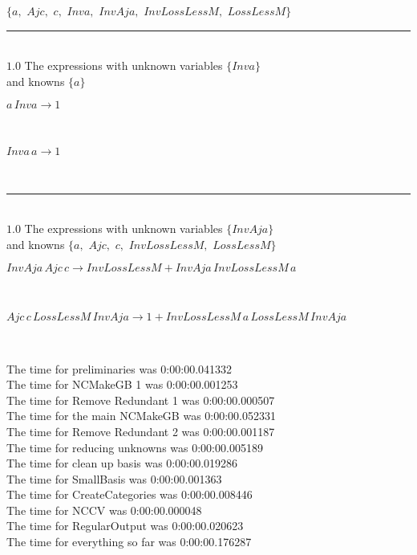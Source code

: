 \documentclass[rep10,leqno]{report}
\begin{document}
$\{a,
$ $
Ajc,
$ $
c,
$ $
Inva,
$ $
InvAja,
$ $
InvLossLessM,
$ $
LossLessM\}$
\smallskip\\
\rule[3pt]{6in}{.7pt}\\
$1.0$  The expressions with unknown variables $\{Inva\}$\\
and knowns $\{a\}$\smallskip\\
\begin{minipage}{6in}
$
a\,
 Inva\rightarrow 1
$
\end{minipage}\medskip \\
\begin{minipage}{6in}
$
Inva\,
 a\rightarrow 1
$
\end{minipage}\\
\rule[3pt]{6in}{.7pt}\\
$1.0$  The expressions with unknown variables $\{InvAja\}$\\
and knowns $\{a,
$ $
Ajc,
$ $
c,
$ $
InvLossLessM,
$ $
LossLessM\}$\smallskip\\
\begin{minipage}{6in}
$
InvAja\,
 Ajc\,
 c\rightarrow InvLossLessM + InvAja\,
 InvLossLessM\,
 a
$
\end{minipage}\medskip \\
\begin{minipage}{6in}
$
Ajc\,
 c\,
 LossLessM\,
 InvAja\rightarrow 1 + InvLossLessM\,
 a\,
 LossLessM\,
 InvAja
$
\end{minipage}\\
\vspace{10pt}

\noindent
The time for preliminaries was 0:00:00.041332\\
The time for NCMakeGB 1 was 0:00:00.001253\\
The time for Remove Redundant 1 was 0:00:00.000507\\
The time for the main NCMakeGB was 0:00:00.052331\\
The time for Remove Redundant 2 was 0:00:00.001187\\
The time for reducing unknowns was 0:00:00.005189\\
The time for clean up basis was 0:00:00.019286\\
The time for SmallBasis was 0:00:00.001363\\
The time for CreateCategories was 0:00:00.008446\\
The time for NCCV was 0:00:00.000048\\
The time for RegularOutput was 0:00:00.020623\\
The time for everything so far was 0:00:00.176287\\
\end{document}

